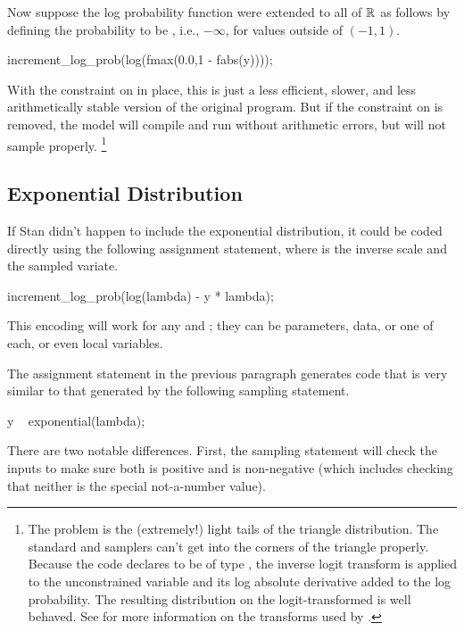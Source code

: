 Now suppose the log probability function were extended to all of
$\reals$ as follows by defining the probability to be ,
i.e., $-\infty$, for values outside of $(-1,1)$.
%
\begin{stancode}
increment_log_prob(log(fmax(0.0,1 - fabs(y))));
\end{stancode}
%
With the constraint on  in place, this is just a less
efficient, slower, and less arithmetically stable version of the
original program.  But if the constraint on  is removed, 
the model will compile and run without arithmetic errors, but will not
sample properly.%
%
\footnote{The problem is the (extremely!) light tails of the triangle
  distribution.  The standard \HMC and \NUTS samplers can't get into the
  corners of the triangle properly.  Because the \Stan code declares
   to be of type , the inverse logit
  transform is applied to the unconstrained variable and its log
  absolute derivative added to the log probability.  The resulting
  distribution on the logit-transformed  is well behaved.  See
   for more information on the
  transforms used by \Stan.}

\subsection{Exponential Distribution}

If Stan didn't happen to include the exponential distribution, it
could be coded directly using the following assignment statement,
where  is the inverse scale and  the sampled
variate.
%
\begin{stancode}
increment_log_prob(log(lambda) - y * lambda);
\end{stancode}
%
This encoding will work for any  and ; they can
be parameters, data, or one of each, or even local variables.

The assignment statement in the previous paragraph generates 
\Cpp code that is very similar to that generated by the following
sampling statement.
%
\begin{stancode}
y ~ exponential(lambda);
\end{stancode}
%
There are two notable differences.  First, the sampling statement will
check the inputs to make sure both  is positive and
 is non-negative (which includes checking that neither is the
special not-a-number value).

